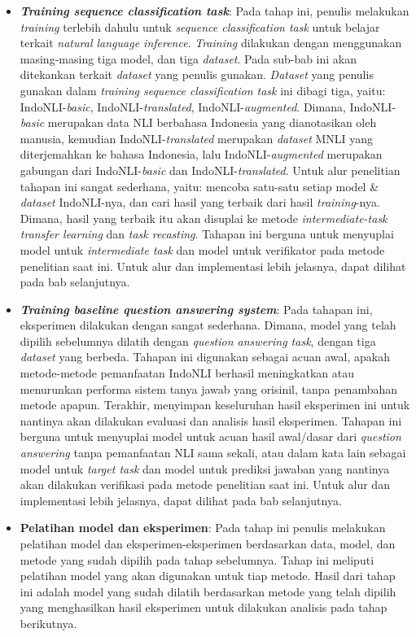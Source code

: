 \begin{itemize}
    \item \textbf{\emph{Training sequence classification task}}: Pada tahap ini, penulis melakukan \emph{training} terlebih dahulu untuk \emph{sequence classification task} untuk belajar terkait \emph{natural language inference}. \emph{Training} dilakukan dengan menggunakan masing-masing tiga model, dan tiga \emph{dataset}. Pada sub-bab ini akan ditekankan terkait \emph{dataset} yang penulis gunakan. \emph{Dataset} yang penulis gunakan dalam \emph{training sequence classification task} ini dibagi tiga, yaitu: IndoNLI-\emph{basic}, IndoNLI-\emph{translated}, IndoNLI-\emph{augmented}. Dimana, IndoNLI-\emph{basic} merupakan data NLI berbahasa Indonesia yang dianotasikan oleh manusia, kemudian IndoNLI-\emph{translated} merupakan \emph{dataset} MNLI yang diterjemahkan ke bahasa Indonesia, lalu IndoNLI-\emph{augmented} merupakan gabungan dari IndoNLI-\emph{basic} dan IndoNLI-\emph{translated}. Untuk alur penelitian tahapan ini sangat sederhana, yaitu: mencoba satu-satu setiap model \& \emph{dataset} IndoNLI-nya, dan cari hasil yang terbaik dari hasil \emph{training}-nya. Dimana, hasil yang terbaik itu akan disuplai ke metode \emph{intermediate-task transfer learning} dan \emph{task recasting}. Tahapan ini berguna untuk menyuplai model untuk \emph{intermediate task} dan model untuk verifikator pada metode penelitian saat ini. Untuk alur dan implementasi lebih jelasnya, dapat dilihat pada bab selanjutnya.

    \item \textbf{\emph{Training baseline question answering system}}: Pada tahapan ini, eksperimen dilakukan dengan sangat sederhana. Dimana, model yang telah dipilih sebelumnya dilatih dengan \emph{question answering task}, dengan tiga \emph{dataset} yang berbeda. Tahapan ini digunakan sebagai acuan awal, apakah metode-metode pemanfaatan IndoNLI berhasil meningkatkan atau menurunkan performa sistem tanya jawab yang orisinil, tanpa penambahan metode apapun. Terakhir, menyimpan keseluruhan hasil eksperimen ini untuk nantinya akan dilakukan evaluasi dan analisis hasil eksperimen. Tahapan ini berguna untuk menyuplai model untuk acuan hasil awal/dasar dari \emph{question answering} tanpa pemanfaatan NLI sama sekali, atau dalam kata lain sebagai model untuk \emph{target task} dan model untuk prediksi jawaban yang nantinya akan dilakukan verifikasi pada metode penelitian saat ini. Untuk alur dan implementasi lebih jelasnya, dapat dilihat pada bab selanjutnya.
    
    \item \textbf{Pelatihan model dan eksperimen}: Pada tahap ini penulis melakukan pelatihan model dan eksperimen-eksperimen berdasarkan data, model, dan metode yang sudah dipilih pada tahap sebelumnya. Tahap ini meliputi pelatihan model yang akan digunakan untuk tiap metode. Hasil dari tahap ini adalah model yang sudah dilatih berdasarkan metode yang telah dipilih yang menghasilkan hasil eksperimen untuk dilakukan analisis pada tahap berikutnya.


\end{itemize}
